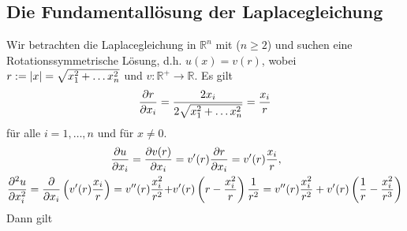 \subsection{Die Fundamentallösung der Laplacegleichung} 
\label{sub:die_fundamentallosung_der_laplacegleichung}
Wir betrachten die Laplacegleichung in $\mathbb{R}^n$ mit ($n \geq 2$) und suchen eine Rotationssymmetrische Lösung, d.h. $u(x) = v(r)$, wobei $r := \lvert x\rvert= \sqrt{x_1^2 + \dots x_n^2}$ und $v : \mathbb{R}^+ \to \mathbb{R}$. Es gilt
\begin{equation}
	\frac{{\partial r}}{{\partial x_i}}  = \frac{2x_i}{2\sqrt{x_1^2 + \dots x_n^2} } = \frac{x_i}{r}
\end{equation}
für alle $i=1,\dots,n$ und für $x \neq 0$.
\begin{align}
	\frac{{\partial u}}{{\partial x_i}}  = \frac{{\partial v(r)}}{{\partial x_i}}  &= v'(r) \frac{{\partial r}}{{\partial x_i}}  = v'(r) \frac{x_i}{r}, \\
	\frac{{\partial ^2u}}{{\partial x_i^2}}  = \frac{{\partial }}{{\partial x_i}}  \left( v'(r) \frac{x_i}{r} \right) = v''(r) \frac{x_i^2}{r^2} + &v'(r) \left( r - \frac{x_i^2}{r} \right) \frac{1}{r^2} = v''(r) \frac{x_i^2}{r^2} + v'(r) \left( \frac{1}{r} - \frac{x_i^2}{r^3} \right)
\end{align}
Dann gilt

